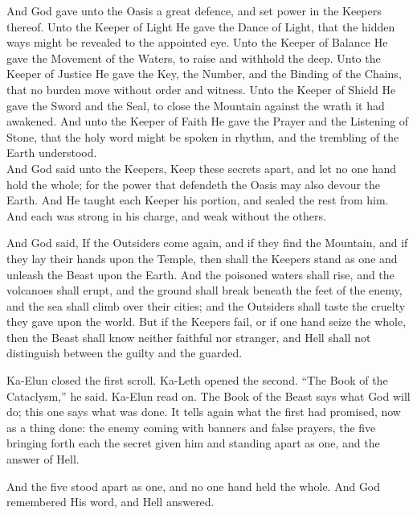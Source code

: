 \begin{scripture}
And God gave unto the Oasis a great defence, and set power in the Keepers thereof. Unto the Keeper of Light He gave the Dance of Light, that the hidden ways might be revealed to the appointed eye. Unto the Keeper of Balance He gave the Movement of the Waters, to raise and withhold the deep. Unto the Keeper of Justice He gave the Key, the Number, and the Binding of the Chains, that no burden move without order and witness. Unto the Keeper of Shield He gave the Sword and the Seal, to close the Mountain against the wrath it had awakened. And unto the Keeper of Faith He gave the Prayer and the Listening of Stone, that the holy word might be spoken in rhythm, and the trembling of the Earth understood.\\
And God said unto the Keepers, Keep these secrets apart, and let no one hand hold the whole; for the power that defendeth the Oasis may also devour the Earth. And He taught each Keeper his portion, and sealed the rest from him. And each was strong in his charge, and weak without the others.
\end{scripture}

\begin{scripture}
And God said, If the Outsiders come again, and if they find the Mountain, and if they lay their hands upon the Temple, then shall the Keepers stand as one and unleash the Beast upon the Earth. And the poisoned waters shall rise, and the volcanoes shall erupt, and the ground shall break beneath the feet of the enemy, and the sea shall climb over their cities; and the Outsiders shall taste the cruelty they gave upon the world. But if the Keepers fail, or if one hand seize the whole, then the Beast shall know neither faithful nor stranger, and Hell shall not distinguish between the guilty and the guarded.
\end{scripture}

Ka-Elun closed the first scroll. Ka-Leth opened the second. ``The Book of the Cataclysm,'' he said. Ka-Elun read on. The Book of the Beast says what God will do; this one says what was done. It tells again what the first had promised, now as a thing done: the enemy coming with banners and false prayers, the five bringing forth each the secret given him and standing apart as one, and the answer of Hell.\par

\begin{scripture}
And the five stood apart as one, and no one hand held the whole. And God remembered His word, and Hell answered.
\end{scripture}

